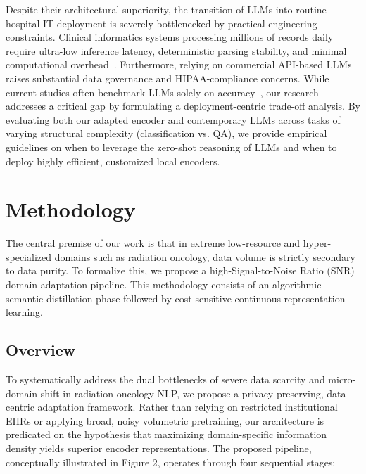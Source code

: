 \documentclass[a4paper,fleqn]{cas-dc}
\begin{document}
Despite their architectural superiority, the transition of LLMs into routine hospital IT deployment is severely bottlenecked by practical engineering constraints. Clinical informatics systems processing millions of records daily require ultra-low inference latency, deterministic parsing stability, and minimal computational overhead~\cite{jiang2023health}. Furthermore, relying on commercial API-based LLMs raises substantial data governance and HIPAA-compliance concerns. While current studies often benchmark LLMs solely on accuracy~\cite{saha2026transforming}, our research addresses a critical gap by formulating a deployment-centric trade-off analysis. By evaluating both our adapted encoder and contemporary LLMs across tasks of varying structural complexity (classification vs. QA), we provide empirical guidelines on when to leverage the zero-shot reasoning of LLMs and when to deploy highly efficient, customized local encoders.

\section{Methodology} \label{Methodology}

The central premise of our work is that in extreme low-resource and hyper-specialized domains such as radiation oncology, data volume is strictly secondary to data purity. To formalize this, we propose a high-Signal-to-Noise Ratio (SNR) domain adaptation pipeline. This methodology consists of an algorithmic semantic distillation phase followed by cost-sensitive continuous representation learning.

\subsection{Overview}
To systematically address the dual bottlenecks of severe data scarcity and micro-domain shift in radiation oncology NLP, we propose a privacy-preserving, data-centric adaptation framework. Rather than relying on restricted institutional EHRs or applying broad, noisy volumetric pretraining, our architecture is predicated on the hypothesis that maximizing domain-specific information density yields superior encoder representations. The proposed pipeline, conceptually illustrated in Figure 2, operates through four sequential stages:

\end{document}
